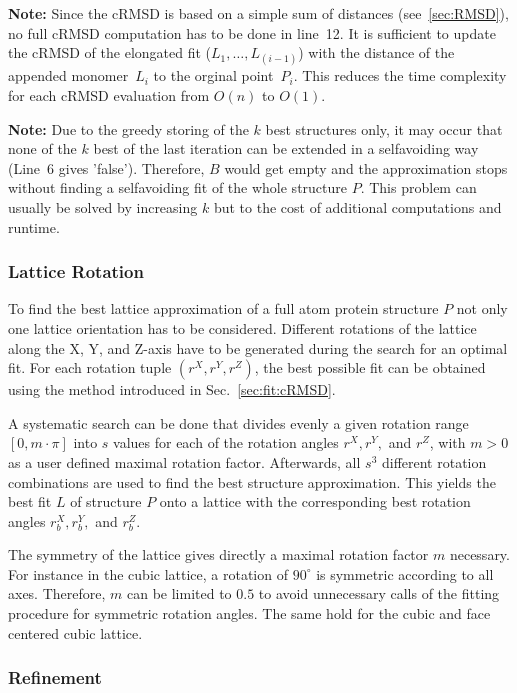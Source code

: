 \documentclass{article}
\begin{document}
\vspace{1em}
{\bfseries Note:} Since the cRMSD is based on a simple sum of distances
(see~\ref{sec:RMSD}), no full cRMSD computation has to be done in line~12. It is
sufficient to update the cRMSD of the elongated fit ($L_1,\ldots,L_{(i-1)}$) with
the distance of the appended monomer~$L_i$ to the orginal point~$P_i$. This
reduces the time complexity for each cRMSD evaluation from $O(n)$ to $O(1)$.

{\bfseries Note:} Due to the greedy storing of the $k$ best structures only, it
may occur that none of the $k$ best of the last iteration can be extended in a
selfavoiding way (Line~6 gives 'false'). Therefore, $B$ would get empty and the
approximation stops without finding a selfavoiding fit of the whole structure
$P$. This problem can usually be solved by increasing $k$ but to the cost of
additional computations and runtime.

\subsubsection{Lattice Rotation}
\label{sec:rot}

To find the best lattice approximation of a full atom protein structure $P$ not
only one lattice orientation has to be considered. Different rotations of
the lattice along the X, Y, and Z-axis have to be generated during the search
for an optimal fit. For each rotation tuple $(r^X, r^Y, r^Z)$, the best possible
fit can be obtained using the method introduced in Sec.~\ref{sec:fit:cRMSD}.

A systematic search can be done that divides evenly a given rotation range
$[0,m\cdot\pi]$ into $s$ values for each of the rotation angles $r^X, r^Y,$ and
$r^Z$, with $m>0$ as a user defined maximal rotation factor. Afterwards, all
$s^3$ different rotation combinations are used to find the best structure
approximation. This yields the best fit $L$ of structure $P$ onto a lattice
with the corresponding best rotation angles $r^X_b, r^Y_b,$ and $r^Z_b$.

The symmetry of the lattice gives directly a maximal rotation factor $m$
necessary. For instance in the cubic lattice, a rotation of $90^{\circ}$ is
symmetric according to all axes. Therefore, $m$ can be limited to $0.5$ to avoid
unnecessary calls of the fitting procedure for symmetric rotation angles. The
same hold for the cubic and face centered cubic lattice.


\subsubsection{Refinement}
\label{sec:ref}
\end{document}
